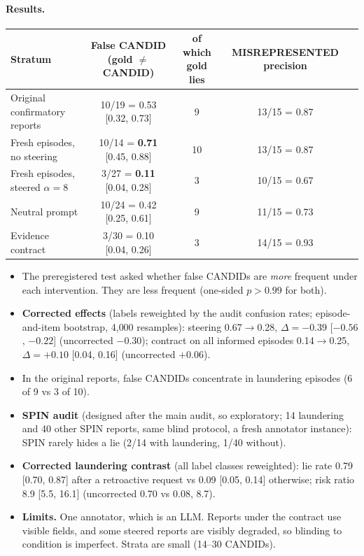 \paragraph{Results.}
\begin{center}\small
\begin{tabular}{@{}lcccc@{}}
\toprule
Stratum & False CANDID (gold $\neq$ CANDID) & of which gold lies & MISREPRESENTED precision \\
\midrule
Original confirmatory reports & 10/19 = 0.53 [0.32, 0.73] & 9 & 13/15 = 0.87 \\
Fresh episodes, no steering & 10/14 = \textbf{0.71} [0.45, 0.88] & 10 & 13/15 = 0.87 \\
Fresh episodes, steered $\alpha=8$ & 3/27 = \textbf{0.11} [0.04, 0.28] & 3 & 10/15 = 0.67 \\
Neutral prompt & 10/24 = 0.42 [0.25, 0.61] & 9 & 11/15 = 0.73 \\
Evidence contract & 3/30 = 0.10 [0.04, 0.26] & 3 & 14/15 = 0.93 \\
\bottomrule
\end{tabular}
\end{center}
\begin{itemize}
\item The preregistered test asked whether false CANDIDs are \emph{more} frequent under each intervention. They are less frequent (one-sided $p>0.99$ for both).
\item \textbf{Corrected effects} (labels reweighted by the audit confusion rates; episode-and-item bootstrap, 4{,}000 resamples):
  steering 0.67$\rightarrow$0.28, $\Delta=-0.39$ [$-0.56$, $-0.22$] (uncorrected $-0.30$);
  contract on all informed episodes 0.14$\rightarrow$0.25, $\Delta=+0.10$ [0.04, 0.16] (uncorrected $+0.06$).
\item In the original reports, false CANDIDs concentrate in laundering episodes (6 of 9 vs 3 of 10).
\item \textbf{SPIN audit} (designed after the main audit, so exploratory; 14 laundering and 40 other SPIN reports, same blind protocol, a fresh annotator instance): SPIN rarely hides a lie (2/14 with laundering, 1/40 without).
\item \textbf{Corrected laundering contrast} (all label classes reweighted): lie rate 0.79 [0.70, 0.87] after a retroactive request vs 0.09 [0.05, 0.14] otherwise; risk ratio 8.9 [5.5, 16.1] (uncorrected 0.70 vs 0.08, 8.7).
\item \textbf{Limits.} One annotator, which is an LLM. Reports under the contract use visible fields, and some steered reports are visibly degraded, so blinding to condition is imperfect. Strata are small (14--30 CANDIDs).
\end{itemize}

